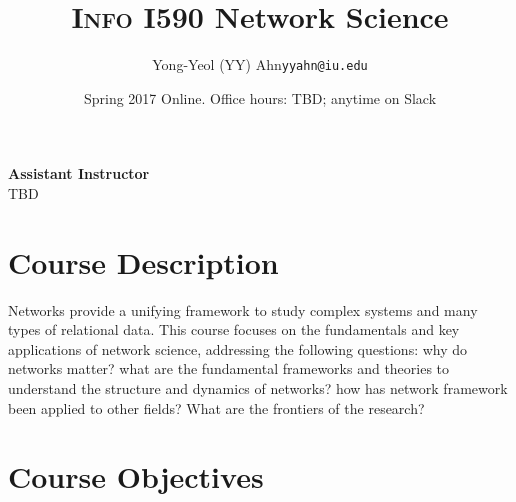 \documentclass[11pt,article,oneside]{memoir}
\makeatletter
\def\myauthor{Author}
\def\mytitle{Title}
\def\myemail{yyahn@iu.edu}
\def\myauthor{Yong-Yeol (YY) Ahn}
\def\mytitle{{\normalsize \textsc{Info} I590 \newline} \HUGE Network Science}
\makeatother
\begin{document}

\def\ind{\hangindent=1 true cm\hangafter=1 \noindent}
\def\labelitemi{$\cdot$}


\title{\LARGE \mytitle}     
\author{\Large\myauthor \newline \footnotesize\texttt{\noindent\myemail}}
\date{Spring 2017 Online. %
\newline Office hours: TBD; anytime on Slack}

\maketitle

\vspace{-20pt}
{\bfseries Assistant Instructor} \\ TBD %



\section{Course Description}

Networks provide a unifying framework to study complex systems and many types
of relational data. This course focuses on the fundamentals and key
applications of network science, addressing the following questions: why do
networks matter? what are the fundamental frameworks and theories to understand
the structure and dynamics of networks? how has network framework been applied
to other fields?  What are the frontiers of the research?

\section{Course Objectives}
\end{document}
